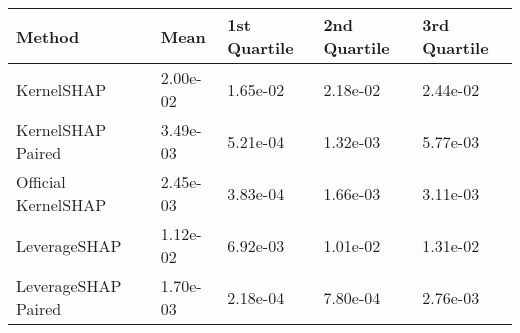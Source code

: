 \begin{tabular}{lllll}
  \toprule
  \textbf{Method} & \textbf{Mean} & \textbf{1st Quartile} & \textbf{2nd Quartile} & \textbf{3rd Quartile} \\ \midrule 
KernelSHAP & 2.00e-02 & 1.65e-02 & 2.18e-02 & 2.44e-02\\
KernelSHAP Paired & \cellcolor{bronze!60}3.49e-03 & \cellcolor{bronze!60}5.21e-04 & \cellcolor{silver!60}1.32e-03 & \cellcolor{bronze!60}5.77e-03\\
Official KernelSHAP & \cellcolor{silver!60}2.45e-03 & \cellcolor{silver!60}3.83e-04 & \cellcolor{bronze!60}1.66e-03 & \cellcolor{silver!60}3.11e-03\\
LeverageSHAP & 1.12e-02 & 6.92e-03 & 1.01e-02 & 1.31e-02\\
LeverageSHAP Paired & \cellcolor{gold!60}1.70e-03 & \cellcolor{gold!60}2.18e-04 & \cellcolor{gold!60}7.80e-04 & \cellcolor{gold!60}2.76e-03\\
\bottomrule
\end{tabular}
